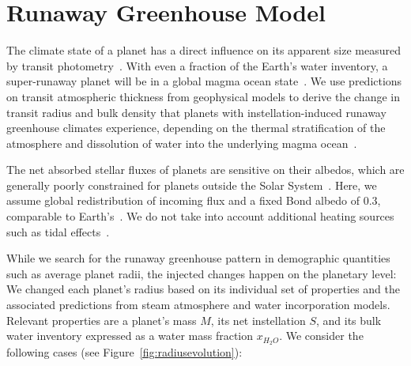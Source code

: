 \documentclass[twocolumn,twocolappendix]{aastex631}
\begin{document}
\section{Runaway Greenhouse Model}\label{sec:met_rghmodel}
The climate state of a planet has a direct influence on its apparent size measured by transit photometry~\citep{Turbet2019,Turbet2020,Mousis2020,2021ApJ...914...84A}.
With even a fraction of the Earth's water inventory, a super-runaway planet will be in a global magma ocean state~\citep{Lichtenberg2021c,Boukrouche2021}.
We use predictions on transit atmospheric thickness from geophysical models to derive the change in transit radius and bulk density that planets with instellation-induced runaway greenhouse climates experience, depending on the thermal stratification of the atmosphere and dissolution of water into the underlying magma ocean~\citep{Dorn2021,Salvador2023}.

The net absorbed stellar fluxes of planets are sensitive on their albedos, which are generally poorly constrained for planets outside the Solar System~\citep[e.g.,][]{Angerhausen2015,Parmentier2018a,Mansfield2019}.
Here, we assume global redistribution of incoming flux and a fixed Bond albedo of $0.3$, comparable to Earth's~\citep{Haar1971}.
We do not take into account additional heating sources such as tidal effects~\citep[e.g.,][]{Barnes2013}.

While we search for the runaway greenhouse pattern in demographic quantities such as average planet radii, the injected changes happen on the planetary level: We changed each planet's radius based on its individual set of properties and the associated predictions from steam atmosphere and water incorporation models.
Relevant properties are a planet's mass $M$, its net instellation $S$, and its bulk water inventory expressed as a water mass fraction $x_{H_2O}$.
We consider the following cases (see Figure~\ref{fig:radiusevolution}):
\end{document}
